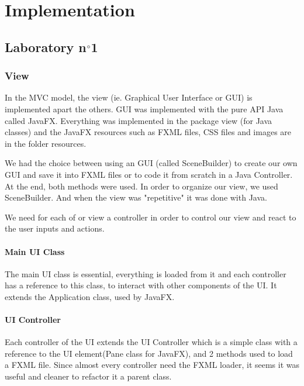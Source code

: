 \documentclass{report}
\begin{document}
\chapter{Implementation}

\section{Laboratory n$\degree$1}

\subsection{View}
In the MVC model, the view (ie. Graphical User Interface or GUI) is implemented apart the others. GUI was implemented with the pure API Java called JavaFX. 
Everything was implemented in the package view (for Java classes) and the JavaFX resources such as FXML files, CSS files and images are in the folder resources. 

We had the choice between using an GUI (called SceneBuilder) to create our own GUI and save it into FXML files or to code it from scratch in a Java Controller. At the end, both methods were used. In order to organize our view, we used SceneBuilder. And when the view was "repetitive" it was done with Java.

We need for each of or view a controller in order to control our view and react to the user inputs and actions.

\subsubsection{Main UI Class}
The main UI class is essential, everything is loaded from it and each controller has a reference to this class, to interact with other components of the UI. It extends the Application class, used by JavaFX.

\subsubsection{UI Controller}
Each controller of the UI extends the UI Controller which is a simple class with a reference to the UI element(Pane class for JavaFX), and 2 methods used to load a FXML file. Since almost every controller need the FXML loader, it seems it was useful and cleaner to refactor it a parent class.
\end{document}
